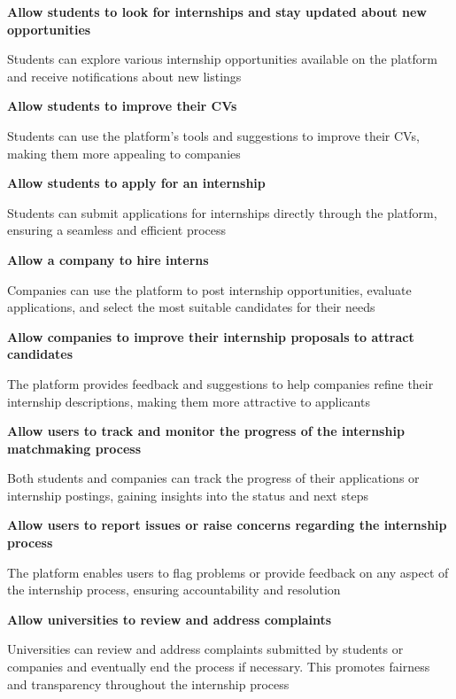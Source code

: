 \begin{goalist}
    \item \textbf{Allow students to look for internships and stay updated about new opportunities}
    
        Students can explore various internship opportunities available on the platform and receive notifications about new listings
    
    \itemgb \textbf{Allow students to improve their CVs}
    
        Students can use the platform’s tools and suggestions to improve their CVs, making them more appealing to companies 
    
    \itemgc \textbf{Allow students to apply for an internship}
    
        Students can submit applications for internships directly through the platform, ensuring a seamless and efficient process 
    
    \itemgd \textbf{Allow a company to hire interns}
    
        Companies can use the platform to post internship opportunities, evaluate applications, and select the most suitable candidates for their needs 
    
    \itemge \textbf{Allow companies to improve their internship proposals to attract candidates}
    
        The platform provides feedback and suggestions to help companies refine their internship descriptions, making them more attractive to applicants 
   
    \itemgf \textbf{Allow users to track and monitor the progress of the internship matchmaking process}
    
        Both students and companies can track the progress of their applications or internship postings, gaining insights into the status and next steps 
    
    \itemgg \textbf{Allow users to report issues or raise concerns regarding the internship process}
    
        The platform enables users to flag problems or provide feedback on any aspect of the internship process, ensuring accountability and resolution 
    
    \itemgh \textbf{Allow universities to review and address complaints}
    
       Universities can review and address complaints submitted by students or companies and eventually end the process if necessary. This promotes fairness and transparency throughout the internship process 

\end{goalist}

